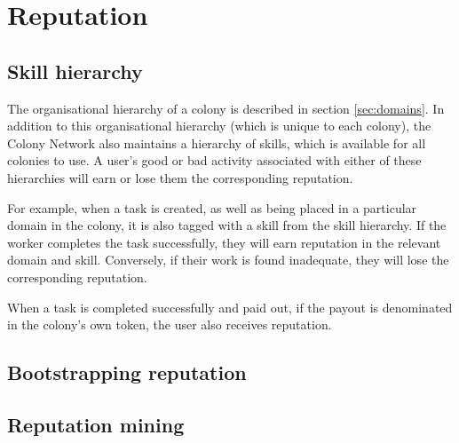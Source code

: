 \section{Reputation}



\subsection{Skill hierarchy}

The organisational hierarchy of a colony is described in section \ref{sec:domains}. In addition to this organisational hierarchy (which is unique to each colony), the Colony Network also maintains a hierarchy of skills, which is available for all colonies to use. A user's good or bad activity associated with either of these hierarchies will earn or lose them the corresponding reputation.

For example, when a task is created, as well as being placed in a particular domain in the colony, it is also tagged with a skill from the skill hierarchy. If the worker completes the task successfully, they will earn reputation in the relevant domain and skill. Conversely, if their work is found inadequate, they will lose the corresponding reputation.

When a task is completed successfully and paid out, if the payout is denominated in the colony's own token, the user also receives reputation. 


\subsection{Bootstrapping reputation}
\subsection{Reputation mining}\label{sec:reputationmining}

